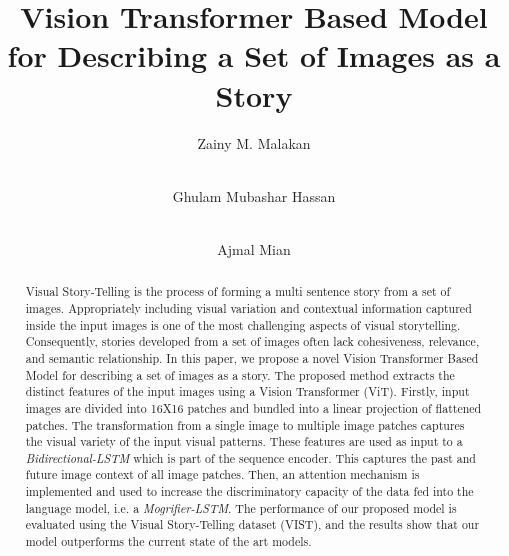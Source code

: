 \documentclass[runningheads]{llncs}
\begin{document}
\title{Vision Transformer Based Model for Describing a Set of Images as a Story}


\author{Zainy M. Malakan \and\\
Ghulam Mubashar Hassan \and\\
Ajmal Mian} 



\maketitle              \begin{abstract}
Visual Story-Telling is the process of forming a multi sentence story from a set of images. Appropriately including visual variation and contextual information captured inside the input images is one of the most challenging aspects of visual storytelling. Consequently, stories developed from a set of images often lack cohesiveness, relevance, and semantic relationship. In this paper, we propose a novel Vision Transformer Based Model for describing a set of images as a story. The proposed method extracts the distinct features of the input images using a Vision Transformer (ViT). Firstly, input images are divided into 16X16 patches and bundled into a linear projection of flattened patches. The transformation from a single image to multiple image patches captures the visual variety of the input visual patterns. These features are used as input to a {\em Bidirectional-LSTM} which is part of the sequence encoder. This captures the past and future image context of all image patches. Then, an attention mechanism is implemented and used to increase the discriminatory capacity of the data fed into the language model, i.e. a {\em Mogrifier-LSTM}. The performance of our proposed model is evaluated using the Visual Story-Telling dataset (VIST), and the results show that our model outperforms the current state of the art models.

\end{abstract}
\end{document}
